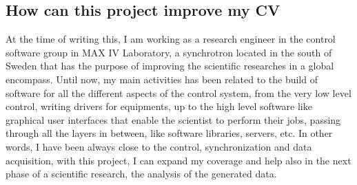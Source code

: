\subsection{How can this project improve my CV}
At the time of writing this, I am working as a research engineer in the control software group in MAX IV Laboratory, a synchrotron located in the south of Sweden that has the purpose of improving the scientific researches in a global encompass.
Until now, my main activities has been related to the build of software for all the different aspects of the control system, from the very low level control, writing drivers for equipments, up to the high level software like graphical user interfaces that enable the scientist to perform their jobs, passing through all the layers in between, like software libraries, servers, etc.
In other words, I have been always close to the control, synchronization and data acquisition, with this project, I can expand my coverage and help also in the next phase of a scientific research, the analysis of the generated data.

